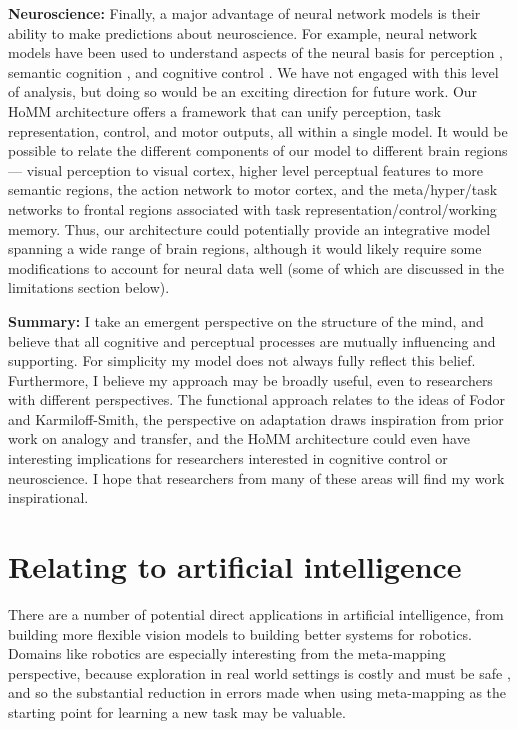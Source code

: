 \textbf{Neuroscience:} Finally, a major advantage of neural network models is their ability to make predictions about neuroscience. For example, neural network models have been used to understand aspects of the neural basis for perception \citep{Yamins2016a}, semantic cognition \citep{Rogers2004}, and cognitive control \citep{Shenhav2013}. We have not engaged with this level of analysis, but doing so would be an exciting direction for future work. Our HoMM architecture offers a framework that can unify perception, task representation, control, and motor outputs, all within a single model. It would be possible to relate the different components of our model to different brain regions --- visual perception to visual cortex, higher level perceptual features to more semantic regions, the action network to motor cortex, and the meta/hyper/task networks to frontal regions associated with task representation/control/working memory. Thus, our architecture could potentially provide an integrative model spanning a wide range of brain regions, although it would likely require some modifications to account for neural data well (some of which are discussed in the limitations section below). \par 

\textbf{Summary:} I take an emergent perspective on the structure of the mind, and believe that all cognitive and perceptual processes are mutually influencing and supporting. For simplicity my model does not always fully reflect this belief. Furthermore, I believe my approach may be broadly useful, even to researchers with different perspectives. The functional approach relates to the ideas of Fodor and Karmiloff-Smith, the perspective on adaptation draws inspiration from prior work on analogy and transfer, and the HoMM architecture could even have interesting implications for researchers interested in cognitive control or neuroscience. I hope that researchers from many of these areas will find my work inspirational.

\section{Relating to artificial intelligence}

There are a number of potential direct applications in artificial intelligence, from building more flexible vision models to building better systems for robotics. Domains like robotics are especially interesting from the meta-mapping perspective, because exploration in real world settings is costly and must be safe \citep{Turchetta2016}, and so the substantial reduction in errors made when using meta-mapping as the starting point for learning a new task may be valuable. \par 

